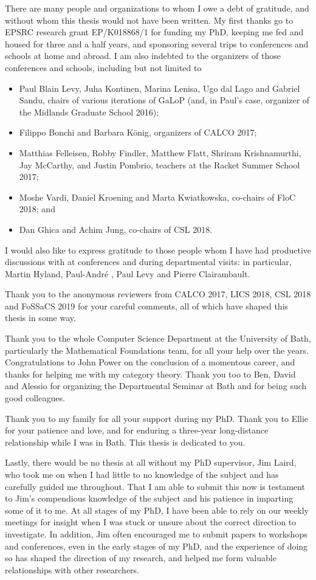 \documentclass[11pt]{report}
\begin{document}
There are many people and organizations to whom I owe a debt of gratitude, and without whom this thesis would not have been written.  
My first thanks go to EPSRC research grant EP/K018868/1 for funding my PhD, keeping me fed and housed for three and a half years, and sponsoring several trips to conferences and schools at home and abroad.  
I am also indebted to the organizers of those conferences and schools, including but not limited to 
\begin{itemize}
  \item Paul Blain Levy, Juha Kontinen, Marina Lenisa, Ugo dal Lago and Gabriel Sandu, chairs of various iterations of GaLoP (and, in Paul's case, organizer of the Midlands Graduate School 2016);
  \item Filippo Bonchi and Barbara K\"{o}nig, organizers of CALCO 2017;
  \item Matthias Felleisen, Robby Findler, Matthew Flatt, Shriram Krishnamurthi, Jay McCarthy, and Justin Pombrio, teachers at the Racket Summer School 2017;
  \item Moshe Vardi, Daniel Kroening and Marta Kwiatkowska, co-chairs of FloC 2018; and
  \item Dan Ghica and Achim Jung, co-chairs of CSL 2018.
\end{itemize}
I would also like to express gratitude to those people whom I have had productive discussions with at conferences and during departmental visits: in particular, Martin Hyland, Paul-Andr\'{e} \Mellies, Paul Levy and Pierre Clairambault.

Thank you to the anonymous reviewers from CALCO 2017, LICS 2018, CSL 2018 and FoSSaCS 2019 for your careful comments, all of which have shaped this thesis in some way.

Thank you to the whole Computer Science Department at the University of Bath, particularly the Mathematical Foundations team, for all your help over the years.  
Congratulations to John Power on the conclusion of a momentous career, and thanks for helping me with my category theory.  
Thank you too to Ben, David and Alessio for organizing the Departmental Seminar at Bath and for being such good colleagues.

Thank you to my family for all your support during my PhD.  
Thank you to Ellie for your patience and love, and for enduring a three-year long-distance relationship while I was in Bath.  
This thesis is dedicated to you.

Lastly, there would be no thesis at all without my PhD supervisor, Jim Laird, who took me on when I had little to no knowledge of the subject and has carefully guided me throughout.  
That I am able to submit this now is testament to Jim's compendious knowledge of the subject and his patience in imparting some of it to me.  
At all stages of my PhD, I have been able to rely on our weekly meetings for insight when I was stuck or unsure about the correct direction to investigate.  
In addition, Jim often encouraged me to submit papers to workshops and conferences, even in the early stages of my PhD, and the experience of doing so has shaped the direction of my research, and helped me form valuable relationships with other researchers.
\end{document}
